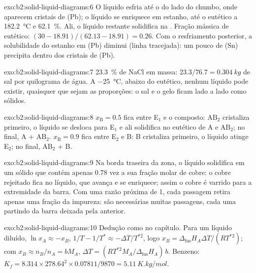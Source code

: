 \begin{solution}{exo:b2:solid-liquid-diagrams:6}
O líquido esfria até o  do lado do chumbo, onde aparecem cristais de
(Pb); o líquido se enriquece em estanho, até o eutético a \qty{182.2}{\degreeCelsius}
e 62.1~\%. Ali, o líquido restante solidifica na .
Fração mássica de eutético: $(30 - 18.91)/(62.13 - 18.91) = 0.26$. Com o
resfriamento posterior, a solubilidade do estanho em (Pb) diminui (linha
tracejada): um pouco de (Sn) precipita dentro dos cristais de (Pb).
\end{solution}

\begin{solution}{exo:b2:solid-liquid-diagrams:7}
23.3~\% de NaCl em massa: $23.3/76.7 = \qty{0.304}{kg}$ de sal por quilograma
de água. A \qty{-25}{\degreeCelsius}, abaixo do eutético, nenhum líquido pode
existir, quaisquer que sejam as proporções: o sal e o gelo ficam lado a lado
como sólidos.
\end{solution}

\begin{solution}{exo:b2:solid-liquid-diagrams:8}
$x_{\mathrm B} = 0.5$ fica entre E$_1$ e o composto: $\mathrm{AB_2}$
cristaliza primeiro, o líquido se desloca para E$_1$ e ali solidifica no
eutético de A e $\mathrm{AB_2}$; no final, A + $\mathrm{AB_2}$.
$x_{\mathrm B} = 0.9$ fica entre E$_2$ e B: B cristaliza primeiro, o líquido
atinge E$_2$; no final, $\mathrm{AB_2}$ + B.
\end{solution}

\begin{solution}{exo:b2:solid-liquid-diagrams:9}
Na borda traseira da zona, o líquido solidifica em um sólido que contém apenas
0.78 vez a sua fração molar de cobre: o cobre rejeitado fica no líquido, que
avança e se enriquece; assim o cobre é varrido para a extremidade da barra.
Com uma razão próxima de 1, cada passagem retira apenas uma fração da
impureza: são necessárias muitas passagens, cada uma partindo da barra
deixada pela anterior.
\end{solution}

\begin{solution}{exo:b2:solid-liquid-diagrams:10}
Dedução como no capítulo. Para um líquido diluído, $\ln x_A \approx -x_B$, $1/T -
1/T^* \approx -\Delta T/T^{*2}$, logo $x_B = \Delta_{\text{fus}}H_A\Delta T/(RT^{*2})$;
com $x_B \approx n_B/n_A = bM_A$, $\Delta T = (RT^{*2}M_A/\Delta_{\text{fus}}H_A)\,b$.
Benzeno: $K_f = 8.314 \times 278.64^2 \times 0.07811/9870 = \qty{5.11}{K.kg/mol}$.
\end{solution}

